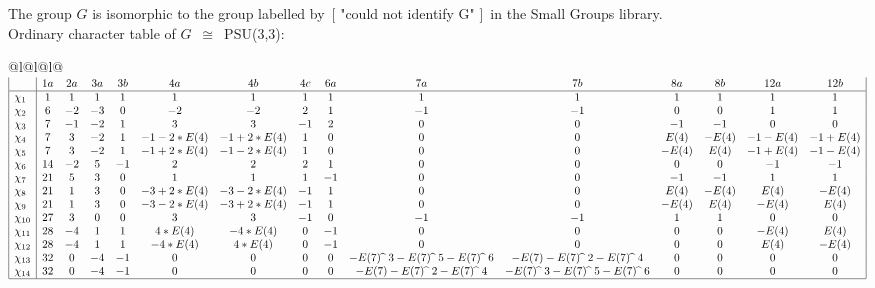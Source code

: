\documentclass[varwidth=\maxdimen,border=10]{standalone}
\begin{document}
The group $G$ is isomorphic to the group labelled by\ [ "could not identify G" ]\ in the Small Groups library.\\
Ordinary character table of $G$\ $\cong$\ PSU(3,3):\\
\begin{center}
\begin{tabular}{@{}l@{}l@{}l@{}}
\hline
\(\begin{array}{|l|cccccccccccccc|}
  & 1a & 2a & 3a & 3b & 4a & 4b & 4c & 6a & 7a & 7b & 8a & 8b & 12a & 12b\\ \hline
\chi_{1} & 1 & 1 & 1 & 1 & 1 & 1 & 1 & 1 & 1 & 1 & 1 & 1 & 1 & 1\\
\chi_{2} & 6 & -2 & -3 & 0 & -2 & -2 & 2 & 1 & -1 & -1 & 0 & 0 & 1 & 1\\
\chi_{3} & 7 & -1 & -2 & 1 & 3 & 3 & -1 & 2 & 0 & 0 & -1 & -1 & 0 & 0\\
\chi_{4} & 7 & 3 & -2 & 1 & -1-2*E(4) & -1+2*E(4) & 1 & 0 & 0 & 0 & E(4) & -E(4) & -1-E(4) & -1+E(4)\\
\chi_{5} & 7 & 3 & -2 & 1 & -1+2*E(4) & -1-2*E(4) & 1 & 0 & 0 & 0 & -E(4) & E(4) & -1+E(4) & -1-E(4)\\
\chi_{6} & 14 & -2 & 5 & -1 & 2 & 2 & 2 & 1 & 0 & 0 & 0 & 0 & -1 & -1\\
\chi_{7} & 21 & 5 & 3 & 0 & 1 & 1 & 1 & -1 & 0 & 0 & -1 & -1 & 1 & 1\\
\chi_{8} & 21 & 1 & 3 & 0 & -3+2*E(4) & -3-2*E(4) & -1 & 1 & 0 & 0 & E(4) & -E(4) & E(4) & -E(4)\\
\chi_{9} & 21 & 1 & 3 & 0 & -3-2*E(4) & -3+2*E(4) & -1 & 1 & 0 & 0 & -E(4) & E(4) & -E(4) & E(4)\\
\chi_{10} & 27 & 3 & 0 & 0 & 3 & 3 & -1 & 0 & -1 & -1 & 1 & 1 & 0 & 0\\
\chi_{11} & 28 & -4 & 1 & 1 & 4*E(4) & -4*E(4) & 0 & -1 & 0 & 0 & 0 & 0 & -E(4) & E(4)\\
\chi_{12} & 28 & -4 & 1 & 1 & -4*E(4) & 4*E(4) & 0 & -1 & 0 & 0 & 0 & 0 & E(4) & -E(4)\\
\chi_{13} & 32 & 0 & -4 & -1 & 0 & 0 & 0 & 0 & -E(7) \widehat{\ }\ {3}-E(7) \widehat{\ }\ {5}-E(7) \widehat{\ }\ {6} & -E(7)-E(7) \widehat{\ }\ {2}-E(7) \widehat{\ }\ {4} & 0 & 0 & 0 & 0\\
\chi_{14} & 32 & 0 & -4 & -1 & 0 & 0 & 0 & 0 & -E(7)-E(7) \widehat{\ }\ {2}-E(7) \widehat{\ }\ {4} & -E(7) \widehat{\ }\ {3}-E(7) \widehat{\ }\ {5}-E(7) \widehat{\ }\ {6} & 0 & 0 & 0 & 0\\
\hline
\end{array}\)\\
\end{tabular}
\end{center}
\end{document}
